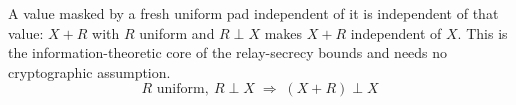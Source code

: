 \begin{lemma}
  \label{lem:one_time_pad}
  \rocqok
  A value masked by a fresh uniform pad independent of it is independent of that
  value: $X + R$ with $R$ uniform and $R \perp X$ makes $X + R$ independent of
  $X$. This is the information-theoretic core of the relay-secrecy bounds and
  needs no cryptographic assumption.
  \[ R \text{ uniform},\ R \perp X \;\Longrightarrow\; (X + R) \perp X \]
\end{lemma}
